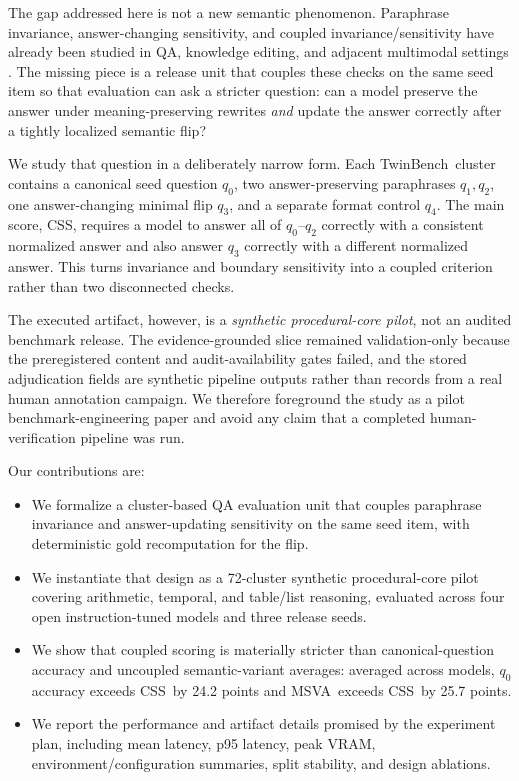\documentclass{article}
\newcommand{\tb}{TwinBench}
\newcommand{\css}{\textsc{CSS}}
\newcommand{\msva}{\textsc{MSVA}}
\begin{document}
The gap addressed here is not a new semantic phenomenon. Paraphrase invariance, answer-changing sensitivity, and coupled invariance/sensitivity have already been studied in QA, knowledge editing, and adjacent multimodal settings \citep{choi2025roparqparaphraseawarealignmentlarge,zhong-etal-2023-mquake,lee2026lgip}. The missing piece is a release unit that couples these checks on the same seed item so that evaluation can ask a stricter question: can a model preserve the answer under meaning-preserving rewrites \emph{and} update the answer correctly after a tightly localized semantic flip?

We study that question in a deliberately narrow form. Each \tb\ cluster contains a canonical seed question $q_0$, two answer-preserving paraphrases $q_1,q_2$, one answer-changing minimal flip $q_3$, and a separate format control $q_4$. The main score, \css, requires a model to answer all of $q_0$--$q_2$ correctly with a consistent normalized answer and also answer $q_3$ correctly with a different normalized answer. This turns invariance and boundary sensitivity into a coupled criterion rather than two disconnected checks.

The executed artifact, however, is a \emph{synthetic procedural-core pilot}, not an audited benchmark release. The evidence-grounded slice remained validation-only because the preregistered content and audit-availability gates failed, and the stored adjudication fields are synthetic pipeline outputs rather than records from a real human annotation campaign. We therefore foreground the study as a pilot benchmark-engineering paper and avoid any claim that a completed human-verification pipeline was run.

Our contributions are:
\begin{itemize}[leftmargin=1.5em]
    \item We formalize a cluster-based QA evaluation unit that couples paraphrase invariance and answer-updating sensitivity on the same seed item, with deterministic gold recomputation for the flip.
    \item We instantiate that design as a 72-cluster synthetic procedural-core pilot covering arithmetic, temporal, and table/list reasoning, evaluated across four open instruction-tuned models and three release seeds.
    \item We show that coupled scoring is materially stricter than canonical-question accuracy and uncoupled semantic-variant averages: averaged across models, $q_0$ accuracy exceeds \css\ by 24.2 points and \msva\ exceeds \css\ by 25.7 points.
    \item We report the performance and artifact details promised by the experiment plan, including mean latency, p95 latency, peak VRAM, environment/configuration summaries, split stability, and design ablations.
\end{itemize}
\end{document}
